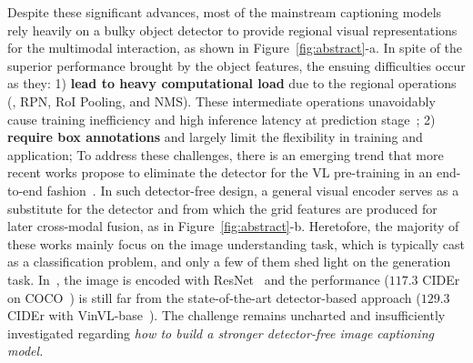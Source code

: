 Despite these significant advances, most of the mainstream captioning models~\citep{cornia2020meshed,pan2020x,ting2019hierarchy,zhang2021rstnet} rely heavily on a bulky object detector to provide regional visual representations for the multimodal interaction, as shown in Figure~\ref{fig:abstract}-a. 
In spite of the superior performance brought by the object features, 
the ensuing difficulties occur as they: 1) \textbf{lead to heavy computational load} due to the regional operations (\ie, RPN, RoI Pooling, and NMS). These intermediate operations unavoidably cause training inefficiency and high inference latency at prediction stage~\citep{kim2021vilt,wang2020minivlm}; 2) \textbf{require box annotations} and largely limit the flexibility in training and application;  
To address these challenges, there is an emerging trend that more recent works propose to eliminate the detector for the VL pre-training in an end-to-end fashion~\citep{jiang2020defense,huang2020pixel,kim2021vilt,yan2021grid,wang2021simvlm}. In such detector-free design, a general visual encoder serves as a substitute for the detector and from which the grid features are produced for later cross-modal fusion, as in Figure~\ref{fig:abstract}{\color{black}-b}.
Heretofore, the majority of these works mainly focus on the image understanding task, which is typically cast as a classification problem, and only a few of them shed light on the generation task.
In~\citep{xu2021e2e}, the image is encoded with ResNet~\citep{he2016deep} and 
the performance ($117.3$ CIDEr on COCO~\citep{xu2021e2e})
is still far from the state-of-the-art detector-based approach ($129.3$ CIDEr with VinVL-base~\citep{zhang2021multi}).
The challenge remains uncharted and insufficiently investigated regarding \textit{how to build a stronger detector-free image captioning model.}


